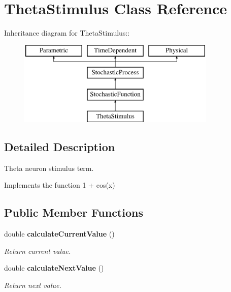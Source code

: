 \section{ThetaStimulus Class Reference}
\label{classThetaStimulus}
Inheritance diagram for ThetaStimulus::\begin{figure}[H]
\begin{center}
\leavevmode
\includegraphics[height=4cm]{classThetaStimulus}
\end{center}
\end{figure}


\subsection{Detailed Description}
Theta neuron stimulus term. 

Implements the function 1 + cos(x) \subsection*{Public Member Functions}
\begin{CompactItemize}
\item 
double {\bf calculateCurrentValue} ()\label{classThetaStimulus_7edd4eaaf036e59fdcb60391ba49d59a}

\begin{CompactList}\small\item\em Return current value. \item\end{CompactList}\item 
double {\bf calculateNextValue} ()\label{classThetaStimulus_131fae2997ed71ba77195da810ad334e}

\begin{CompactList}\small\item\em Return next value. \item\end{CompactList}\end{CompactItemize}
